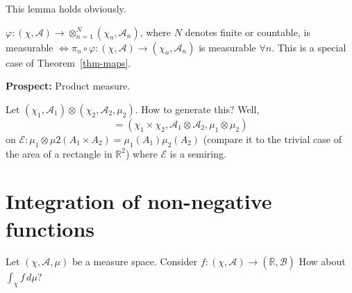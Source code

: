 \documentclass[a4paper]{article}
\numberwithin{lecref}{section}
\theoremstyle{break}
\begin{document}
This lemma holds obviously.

\begin{theorem}
  $\varphi: (\chi, \mathcal A) \to \otimes_{n=1}^N (\chi_n, \mathcal A_n)$,
  where $N$ denotes finite or countable,
  is measurable $\iff \pi_n \circ \varphi: (\chi, \mathcal A) \to (\chi_n, \mathcal A_n)$ is measurable $\forall n$.
  This is a special case of Theorem~\ref{thm-maps}.
\end{theorem}

\textbf{Prospect:} Product measure.

Let $(\chi_1, \mathcal A_1) \otimes (\chi_2, \mathcal A_2, \mu_2)$.
How to generate this? Well,
\[ = (\chi_1 \times \chi_2, \mathcal A_1 \otimes \mathcal A_2, \mu_1 \otimes \mu_2) \]
on $\mathcal E: \mu_1 \otimes \mu2 (A_1 \times A_2) = \mu_1(A_1) \mu_2(A_2)$ (compare it to the trivial case of the area of a rectangle in $\mathbb R^2$) where $\mathcal E$ is a semiring.

\section{Integration of non-negative functions}

Let $(\chi, \mathcal A, \mu)$ be a measure space.
Consider $f: (\chi, \mathcal A) \to (\overline{\mathbb R}, \mathcal B)$
How about $\int_{\chi} f \, d\mu$?
\end{document}
